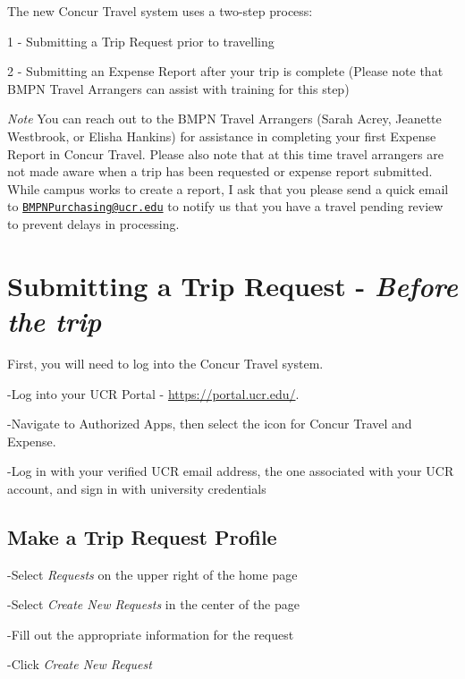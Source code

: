 \documentclass[
]{book}
\begin{document}
The new Concur Travel system uses a two-step process:

1 - Submitting a Trip Request prior to travelling

2 - Submitting an Expense Report after your trip is complete (Please note that BMPN Travel Arrangers can assist with training for this step)

\emph{Note} You can reach out to the BMPN Travel Arrangers (Sarah Acrey, Jeanette Westbrook, or Elisha Hankins) for assistance in completing your first Expense Report in Concur Travel. Please also note that at this time travel arrangers are not made aware when a trip has been requested or expense report submitted. While campus works to create a report, I ask that you please send a quick email to \href{mailto:BMPNPurchasing@ucr.edu}{\nolinkurl{BMPNPurchasing@ucr.edu}} to notify us that you have a travel pending review to prevent delays in processing.

\hypertarget{submitting-a-trip-request---before-the-trip}{%
\section{\texorpdfstring{Submitting a Trip Request - \emph{Before the trip}}{Submitting a Trip Request - Before the trip}}\label{submitting-a-trip-request---before-the-trip}}

First, you will need to log into the Concur Travel system.

-Log into your UCR Portal - \url{https://portal.ucr.edu/}.

-Navigate to Authorized Apps, then select the icon for Concur Travel and Expense.

-Log in with your verified UCR email address, the one associated with your UCR account, and sign in with university credentials

\hypertarget{make-a-trip-request-profile}{%
\subsection{Make a Trip Request Profile}\label{make-a-trip-request-profile}}

-Select \emph{Requests} on the upper right of the home page

-Select \emph{Create New Requests} in the center of the page

-Fill out the appropriate information for the request

-Click \emph{Create New Request}
\end{document}
